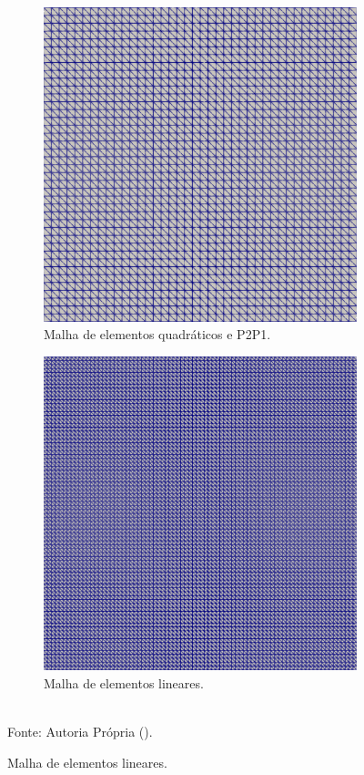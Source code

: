 \begin{figure}[h!]
    \centering
    \caption{Cavidade bidimensional - Malhas utilizadas.}
    \begin{subfigure}{0.49\textwidth}
        \centering
        \includegraphics[width=.8\linewidth]{Figuras/Cavity/m1.png}
        \caption{Malha de elementos quadráticos e P2P1.}
    \end{subfigure}
    \begin{subfigure}{0.49\textwidth}
        \centering
        \includegraphics[width=.8\linewidth]{Figuras/Cavity/m1-Lin.png}
        \caption{Malha de elementos lineares.}
    \end{subfigure}
    \\Fonte: Autoria Própria (\the\year).
    \label{fig:cavity-mesh}
\end{figure}

